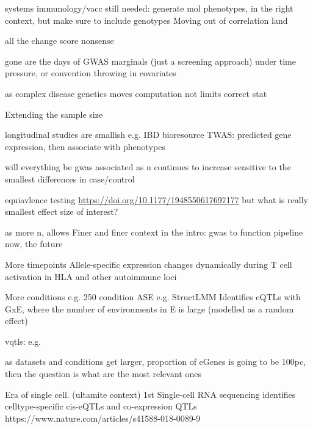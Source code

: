 \begin{outline}
    systems immunology/vacc still needed: generate mol phenotypes, in the right context,
    but make sure to include genotypes
    Moving out of correlation land

    all the change score nonsense

    gone are the days of GWAS marginals (just a screening approach)
        under time pressure, or convention
        throwing in covariates

    as     complex disease genetics moves 
    computation not limits correct stat


Extending the sample size

    longitudinal studies are smallish
    e.g. IBD bioresource
        TWAS: predicted gene expression, then associate with phenotypes

    will everything be gwas associated as n continues to increase
    sensitive to the smallest differences in case/control
    
    equiavlence testing \url{https://doi.org/10.1177/1948550617697177}
        but what is really smallest effect size of interest?

as more n, allows
Finer and finer context
    in the intro: gwas to function pipeline
    now, the future

    More timepoints
    Allele-specific expression changes dynamically during T cell activation in HLA and other autoimmune loci

    More conditions
    e.g. 250 condition ASE %
    e.g. StructLMM 
        Identifies eQTLs with GxE, where the number of environments in E is large (modelled as a random effect)

        vqtls: e.g. %

    as datasets and conditions get larger, proportion of eGenes is going to be 100pc, then the question is what are the most relevant ones

    Era of single cell. (ultamite context)
        1st
        Single-cell RNA sequencing identifies celltype-specific cis-eQTLs and co-expression QTLs
        https://www.nature.com/articles/s41588-018-0089-9


\end{outline}
